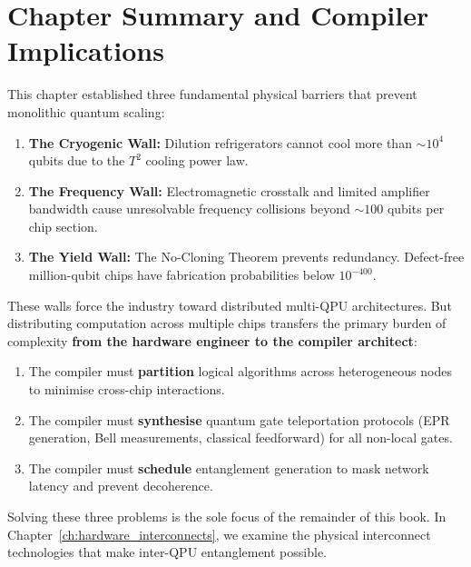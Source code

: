 
\section{Chapter Summary and Compiler Implications}
\label{sec:ch1_summary}

This chapter established three fundamental physical barriers that prevent monolithic quantum scaling:

\begin{enumerate}
    \item \textbf{The Cryogenic Wall:} Dilution refrigerators cannot cool more than $\sim 10^4$ qubits due to the $T^2$ cooling power law.
    \item \textbf{The Frequency Wall:} Electromagnetic crosstalk and limited amplifier bandwidth cause unresolvable frequency collisions beyond $\sim 100$ qubits per chip section.
    \item \textbf{The Yield Wall:} The No-Cloning Theorem prevents redundancy. Defect-free million-qubit chips have fabrication probabilities below $10^{-400}$.
\end{enumerate}

These walls force the industry toward distributed multi-QPU architectures. But distributing computation across multiple chips transfers the primary burden of complexity \textbf{from the hardware engineer to the compiler architect}:

\begin{enumerate}
    \item The compiler must \textbf{partition} logical algorithms across heterogeneous nodes to minimise cross-chip interactions.
    \item The compiler must \textbf{synthesise} quantum gate teleportation protocols (EPR generation, Bell measurements, classical feedforward) for all non-local gates.
    \item The compiler must \textbf{schedule} entanglement generation to mask network latency and prevent decoherence.
\end{enumerate}

Solving these three problems is the sole focus of the remainder of this book. In Chapter~\ref{ch:hardware_interconnects}, we examine the physical interconnect technologies that make inter-QPU entanglement possible.

